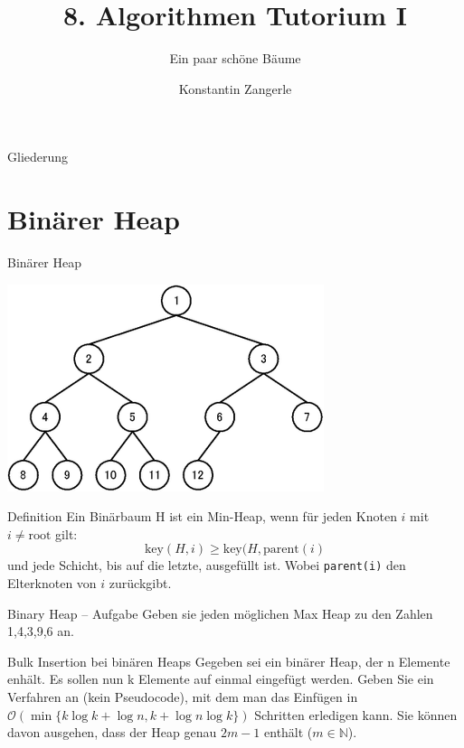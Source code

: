 \documentclass[18pt]{beamer}
\title[Algo I Tut]{8. Algorithmen Tutorium I}
\subtitle{Ein paar schöne Bäume}
\author[Zangerle]{Konstantin Zangerle}
\institute{Institut für Theoretische Informatik}
\newcommand{\N}{\mathbb{N}}
\newcommand{\Oh}{\mathcal{O}}
\begin{document}

\begin{frame}
\titlepage
\end{frame}

\begin{frame}{Gliederung}
 \tableofcontents
\end{frame}

\section{Binärer Heap}
\begin{frame}[fragile]{Binärer Heap}

\hspace{13em}
\includegraphics[scale=0.4]{Binary_heap_indexing}
 \begin{block}{Definition}
  Ein Binärbaum H ist ein Min-Heap, wenn für jeden Knoten $i$ mit $i \neq \text{root}$ gilt:
  $$\text{key}(H,i) \geq \text{key}(H,\text{parent}(i)$$
  und jede Schicht, bis auf die letzte, ausgefüllt ist.
  Wobei \verb|parent(i)| den Elterknoten von $i$ zurückgibt.
 \end{block}

\end{frame}

\begin{frame}{Binary Heap -- Aufgabe}
Geben sie jeden möglichen Max Heap zu den Zahlen 1,4,3,9,6 an.
\end{frame}

\begin{frame}{Bulk Insertion bei binären Heaps}
Gegeben sei ein binärer Heap, der n Elemente enhält. Es sollen nun k Elemente auf einmal
eingefügt werden. Geben Sie ein Verfahren an (kein Pseudocode), mit dem man das Einfügen in $\Oh(\min\{k \log k + \log n, k + \log n \log k \})$ Schritten erledigen kann.
Sie können davon ausgehen, dass der Heap genau $2m - 1$ enthält ($m \in \N$).
\end{frame}
\end{document}
